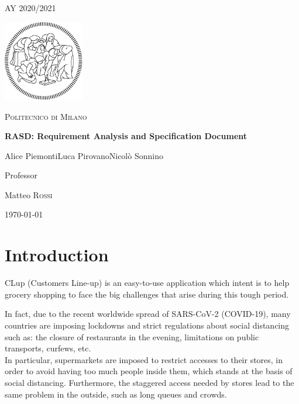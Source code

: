 \documentclass[table, 12pt]{article}
\begin{document}
\begin{titlepage}
    \centering
    {\scshape\large AY 2020/2021 \par}
    \vfill
    \includegraphics[width=100pt]{assets/logo-polimi-new}\par\vspace{1cm}
    {\scshape\LARGE Politecnico di Milano \par}
    \vspace{1.5cm}
    {\huge\bfseries RASD\@: Requirement Analysis
        and Specification Document \par}
    \vspace{2cm}
    {\Large {Alice Piemonti\quad Luca Pirovano\quad Nicolò Sonnino}\par}
    \vfill
    {\large Professor\par
        Matteo \textsc{Rossi}}
    \vfill
    {\large \today \par}
\end{titlepage}
\thispagestyle{plain}
\mbox{}
\newpage
{}
\tableofcontents
\newpage
{}

\section{Introduction}
CLup (Customers Line-up) is an easy-to-use application which intent is to help grocery shopping to face the big challenges that arise during this tough period.

In fact, due to the recent worldwide spread of SARS-CoV-2 (COVID-19), many countries are imposing lockdowns and strict regulations about social distancing such as: the closure of restaurants in the evening, limitations on public transports, curfews, etc.\\

In particular, supermarkets are imposed to restrict accesses to their stores, in order to avoid having too much people inside them, which stands at the basis of social distancing. Furthermore, the staggered access needed by stores lead to the same problem in the outside, such as long queues and crowds.
\end{document}
